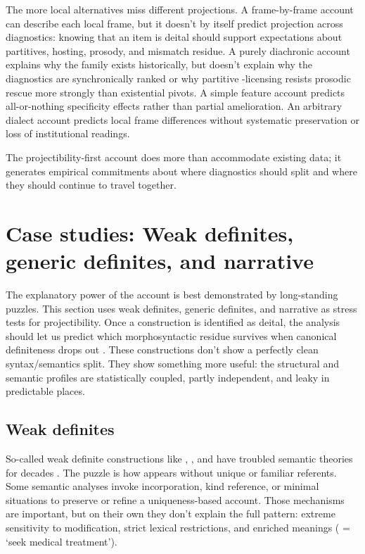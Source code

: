\documentclass[12pt,letterpaper]{article}
\begin{document}
The more local alternatives miss different projections. A frame-by-frame account can describe each local frame, but it doesn't by itself predict projection across diagnostics: knowing that an item is deital should support expectations about partitives, hosting, prosody, and mismatch residue. A purely diachronic account explains why the family exists historically, but doesn't explain why the diagnostics are synchronically ranked or why partitive -licensing resists prosodic rescue more strongly than existential pivots. A simple feature account predicts all-or-nothing specificity effects rather than partial amelioration. An arbitrary dialect account predicts local frame differences without systematic preservation or loss of institutional readings.

The projectibility-first account does more than accommodate existing data; it generates empirical commitments about where diagnostics should split and where they should continue to travel together.

\section{Case studies: Weak definites, generic definites, and narrative }\label{sec:cases}

The explanatory power of the account is best demonstrated by long-standing puzzles. This section uses weak definites, generic definites, and narrative  as stress tests for projectibility. Once a construction is identified as deital, the analysis should let us predict which morphosyntactic residue survives when canonical definiteness drops out \parencite{FrancisMichaelis2003}. These constructions don't show a perfectly clean syntax/semantics split. They show something more useful: the structural and semantic profiles are statistically coupled, partly independent, and leaky in predictable places.

\subsection{Weak definites}

So-called weak definite constructions like , , and  have troubled semantic theories for decades \parencite{carlsonsussman2005,aguilarguevarazwarts2010}. The puzzle is how  appears without unique or familiar referents. Some semantic analyses invoke incorporation, kind reference, or minimal situations to preserve or refine a uniqueness-based account. Those mechanisms are important, but on their own they don't explain the full pattern: extreme sensitivity to modification, strict lexical restrictions, and enriched meanings ( = `seek medical treatment').
\end{document}
